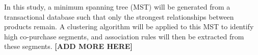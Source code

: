 \documentclass[paper=a4,fontsize=11pt]{report}	%
\begin{document}
In this study, a minimum spanning tree (MST) will be generated from a transactional database such that only the strongest relationships between products remain. A clustering algorithm will be applied to this MST to identify high co-purchase segments, and association rules will then be extracted from these segments. \textbf{[ADD MORE HERE]}

\newpage\tableofcontents\newpage

\setcounter{page}{1}		%

\pagestyle{fancy}
\fancyhf{}
\lhead{\leftmark}





\printbibliography[heading=bibintoc, title=References]

\end{document}
